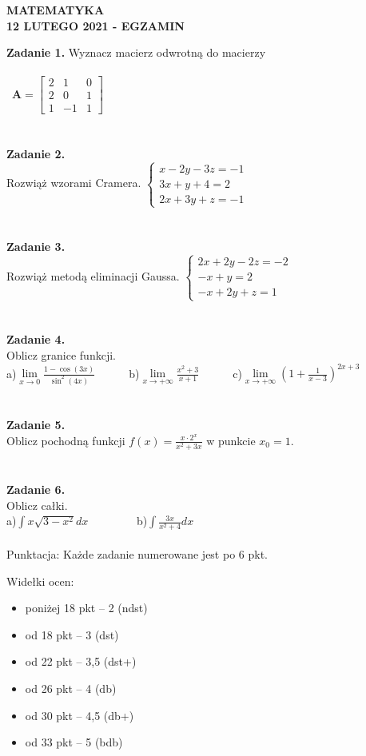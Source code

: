 \documentclass[12pt,a4paper]{report}
\begin{document}
\begin{center}

\textbf{MATEMATYKA \\12 LUTEGO 2021 - EGZAMIN}

\end{center}\textbf{Zadanie 1.} Wyznacz macierz odwrotną do macierzy \\\\\ $\mathbf{A} =\left[ \begin{array}{ccc}2 & 1& 0\\2& 0& 1\\1 & -1& 1\end{array} \right]$\\\\\\\textbf{Zadanie 2.}  \\Rozwiąż wzorami Cramera. $\left\{ \begin{array}{ll}x-2y-3z=-1\\ 3x+y+4=2\\2x+3y+z=-1\end{array}\right.$\\\\\\\textbf{Zadanie 3.} \\Rozwiąż metodą eliminacji Gaussa. $\left\{ \begin{array}{ll}2x+2y-2z=-2\\ -x+y=2\\-x+2y+z=1\end{array} \right.$\\\\\\\textbf{Zadanie 4.} \\Oblicz granice funkcji.\\a)$\lim\limits_{x\to 0}\frac{1-\cos(3x)}{\sin^2(4x)}$\ \ \ \ \ \  b)$\lim\limits_{x\to +\infty}\frac{x^2+3}{x+1}$\ \ \ \ \ \ c)$\lim\limits_{x\to +\infty}\left( 1+\frac{1}{x-3}\right)^{2x+3}$\\\\\\\textbf{Zadanie 5.} \\ Oblicz pochodną funkcji $f(x)=\frac{x\cdot 2^x}{x^2+3x}$ w punkcie $x_0=1$.\\\\\\\textbf{Zadanie 6.} \\Oblicz całki. \\a)$\int x\sqrt{3-x^2} dx$ \ \ \ \ \ \ \ \ b)$\int \frac{3x}{x^2+4} dx$\\\\Punktacja: Każde zadanie numerowane jest po 6 pkt.



Widełki ocen:

\begin{itemize}

\item poniżej 18 pkt -- 2 (ndst)

\item od 18 pkt -- 3 (dst)

\item od 22 pkt -- 3,5 (dst+)

\item od 26 pkt -- 4 (db)

\item od 30 pkt -- 4,5 (db+)

\item od 33 pkt -- 5 (bdb)

\end{itemize}
\end{document}
